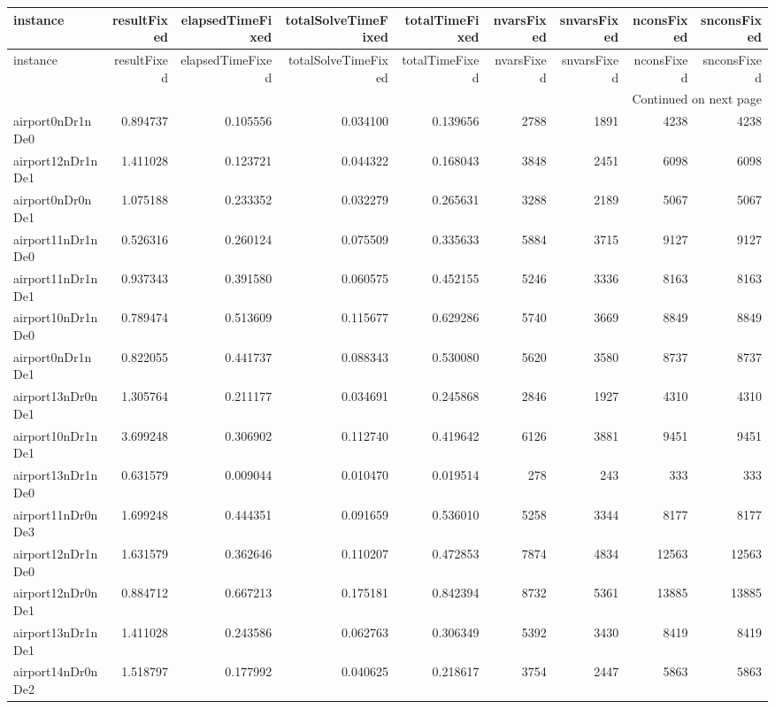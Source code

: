 \begin{longtable}{|l|r|r|r|r|r|r|r|r|}
\toprule
instance & resultFixed & elapsedTimeFixed & totalSolveTimeFixed & totalTimeFixed & nvarsFixed & snvarsFixed & nconsFixed & snconsFixed \\
\midrule
\endfirsthead
\toprule
instance & resultFixed & elapsedTimeFixed & totalSolveTimeFixed & totalTimeFixed & nvarsFixed & snvarsFixed & nconsFixed & snconsFixed \\
\midrule
\endhead
\midrule
\multicolumn{9}{r}{Continued on next page} \\
\midrule
\endfoot
\bottomrule
\endlastfoot
airport0nDr1nDe0 & 0.894737 & 0.105556 & 0.034100 & 0.139656 & 2788 & 1891 & 4238 & 4238 \\
airport12nDr1nDe1 & 1.411028 & 0.123721 & 0.044322 & 0.168043 & 3848 & 2451 & 6098 & 6098 \\
airport0nDr0nDe1 & 1.075188 & 0.233352 & 0.032279 & 0.265631 & 3288 & 2189 & 5067 & 5067 \\
airport11nDr1nDe0 & 0.526316 & 0.260124 & 0.075509 & 0.335633 & 5884 & 3715 & 9127 & 9127 \\
airport11nDr1nDe1 & 0.937343 & 0.391580 & 0.060575 & 0.452155 & 5246 & 3336 & 8163 & 8163 \\
airport10nDr1nDe0 & 0.789474 & 0.513609 & 0.115677 & 0.629286 & 5740 & 3669 & 8849 & 8849 \\
airport0nDr1nDe1 & 0.822055 & 0.441737 & 0.088343 & 0.530080 & 5620 & 3580 & 8737 & 8737 \\
airport13nDr0nDe1 & 1.305764 & 0.211177 & 0.034691 & 0.245868 & 2846 & 1927 & 4310 & 4310 \\
airport10nDr1nDe1 & 3.699248 & 0.306902 & 0.112740 & 0.419642 & 6126 & 3881 & 9451 & 9451 \\
airport13nDr1nDe0 & 0.631579 & 0.009044 & 0.010470 & 0.019514 & 278 & 243 & 333 & 333 \\
airport11nDr0nDe3 & 1.699248 & 0.444351 & 0.091659 & 0.536010 & 5258 & 3344 & 8177 & 8177 \\
airport12nDr1nDe0 & 1.631579 & 0.362646 & 0.110207 & 0.472853 & 7874 & 4834 & 12563 & 12563 \\
airport12nDr0nDe1 & 0.884712 & 0.667213 & 0.175181 & 0.842394 & 8732 & 5361 & 13885 & 13885 \\
airport13nDr1nDe1 & 1.411028 & 0.243586 & 0.062763 & 0.306349 & 5392 & 3430 & 8419 & 8419 \\
airport14nDr0nDe2 & 1.518797 & 0.177992 & 0.040625 & 0.218617 & 3754 & 2447 & 5863 & 5863 \\

\end{longtable}
